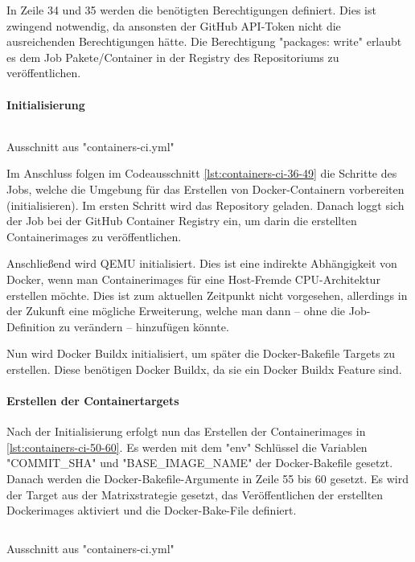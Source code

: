 In Zeile 34 und 35 werden die benötigten Berechtigungen definiert. Dies ist zwingend notwendig, da ansonsten der GitHub API-Token nicht die ausreichenden Berechtigungen hätte. Die Berechtigung "packages: write" erlaubt es dem Job Pakete/Container in der Registry des Repositoriums zu veröffentlichen.


\paragraph{Initialisierung}

\begin{listing}[H]
    \inputminted[firstline=36,lastline=49]{yaml}{./code-examples/containers-ci.yml}
    \caption{Ausschnitt aus "containers-ci.yml"}
    \label{lst:containers-ci-36-49}
\end{listing}

Im Anschluss folgen im Codeausschnitt \cref{lst:containers-ci-36-49} die Schritte des Jobs, welche die Umgebung für das Erstellen von Docker-Containern vorbereiten (initialisieren). Im ersten Schritt wird das Repository geladen. Danach loggt sich der Job bei der GitHub Container Registry ein, um darin die erstellten Containerimages zu veröffentlichen. 

Anschließend wird QEMU initialisiert. Dies ist eine indirekte Abhängigkeit von Docker, wenn man Containerimages für eine Host-Fremde CPU-Architektur erstellen möchte. Dies ist zum aktuellen Zeitpunkt nicht vorgesehen, allerdings in der Zukunft eine mögliche Erweiterung, welche man dann – ohne die Job-Definition zu verändern – hinzufügen könnte.

Nun wird Docker Buildx initialisiert, um später die Docker-Bakefile Targets zu erstellen. Diese benötigen Docker Buildx, da sie ein Docker Buildx Feature sind. 



\paragraph{Erstellen der Containertargets}

Nach der Initialisierung erfolgt nun das Erstellen der Containerimages in \cref{lst:containers-ci-50-60}. Es werden mit dem "env" Schlüssel die Variablen "COMMIT\_SHA" und "BASE\_IMAGE\_NAME" der Docker-Bakefile gesetzt. Danach werden die Docker-Bakefile-Argumente in Zeile 55 bis 60 gesetzt. Es wird der Target aus der Matrixstrategie gesetzt, das Veröffentlichen der erstellten Dockerimages aktiviert und die Docker-Bake-File definiert.

\begin{listing}[H]
    \inputminted[firstline=50,lastline=60]{yaml}{./code-examples/containers-ci.yml}
    \caption{Ausschnitt aus "containers-ci.yml"}
    \label{lst:containers-ci-50-60}
\end{listing}
\FloatBarrier